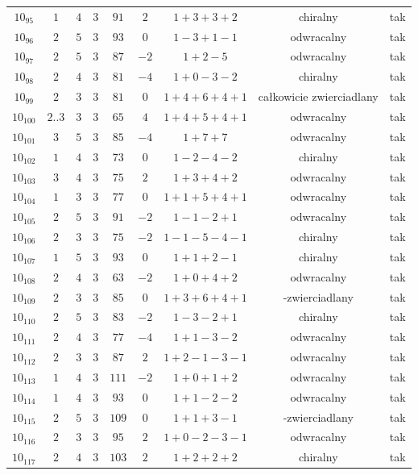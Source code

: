 \begin{longtable}{ccccccccc}
$10_{95}$ & $1$ & $4$ & $3$ & $91$ & $2$ & $1+3+3+2$ & chiralny & tak \\
$10_{96}$ & $2$ & $5$ & $3$ & $93$ & $0$ & $1-3+1-1$ & odwracalny & tak \\
$10_{97}$ & $2$ & $5$ & $3$ & $87$ & $-2$ & $1+2-5$ & odwracalny & tak \\
$10_{98}$ & $2$ & $4$ & $3$ & $81$ & $-4$ & $1+0-3-2$ & chiralny & tak \\
$10_{99}$ & $2$ & $3$ & $3$ & $81$ & $0$ & $1+4+6+4+1$ & całkowicie zwierciadlany & tak \\
$10_{100}$ & $2..3$ & $3$ & $3$ & $65$ & $4$ & $1+4+5+4+1$ & odwracalny & tak \\
$10_{101}$ & $3$ & $5$ & $3$ & $85$ & $-4$ & $1+7+7$ & odwracalny & tak \\
$10_{102}$ & $1$ & $4$ & $3$ & $73$ & $0$ & $1-2-4-2$ & chiralny & tak \\
$10_{103}$ & $3$ & $4$ & $3$ & $75$ & $2$ & $1+3+4+2$ & odwracalny & tak \\
$10_{104}$ & $1$ & $3$ & $3$ & $77$ & $0$ & $1+1+5+4+1$ & odwracalny & tak \\
$10_{105}$ & $2$ & $5$ & $3$ & $91$ & $-2$ & $1-1-2+1$ & odwracalny & tak \\
$10_{106}$ & $2$ & $3$ & $3$ & $75$ & $-2$ & $1-1-5-4-1$ & chiralny & tak \\
$10_{107}$ & $1$ & $5$ & $3$ & $93$ & $0$ & $1+1+2-1$ & chiralny & tak \\
$10_{108}$ & $2$ & $4$ & $3$ & $63$ & $-2$ & $1+0+4+2$ & odwracalny & tak \\
$10_{109}$ & $2$ & $3$ & $3$ & $85$ & $0$ & $1+3+6+4+1$ & -zwierciadlany & tak \\
$10_{110}$ & $2$ & $5$ & $3$ & $83$ & $-2$ & $1-3-2+1$ & chiralny & tak \\
$10_{111}$ & $2$ & $4$ & $3$ & $77$ & $-4$ & $1+1-3-2$ & odwracalny & tak \\
$10_{112}$ & $2$ & $3$ & $3$ & $87$ & $2$ & $1+2-1-3-1$ & odwracalny & tak \\
$10_{113}$ & $1$ & $4$ & $3$ & $111$ & $-2$ & $1+0+1+2$ & odwracalny & tak \\
$10_{114}$ & $1$ & $4$ & $3$ & $93$ & $0$ & $1+1-2-2$ & odwracalny & tak \\
$10_{115}$ & $2$ & $5$ & $3$ & $109$ & $0$ & $1+1+3-1$ & -zwierciadlany & tak \\
$10_{116}$ & $2$ & $3$ & $3$ & $95$ & $2$ & $1+0-2-3-1$ & odwracalny & tak \\
$10_{117}$ & $2$ & $4$ & $3$ & $103$ & $2$ & $1+2+2+2$ & chiralny & tak \\

\end{longtable}
